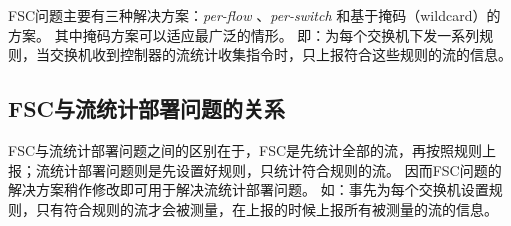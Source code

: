 FSC问题主要有三种解决方案：\emph{per-flow} \cite{van2014opennetmon}、\emph{per-switch} \cite{su2014flowcover}\cite{su2015cemon}\cite{tootoonchian2010opentm}和基于掩码（wildcard）的方案\cite{xu2017miniming}。
其中掩码方案可以适应最广泛的情形。
即：为每个交换机下发一系列规则，当交换机收到控制器的流统计收集指令时，只上报符合这些规则的流的信息。

\subsection{FSC与流统计部署问题的关系}
FSC与流统计部署问题之间的区别在于，FSC是先统计全部的流，再按照规则上报；流统计部署问题则是先设置好规则，只统计符合规则的流。
因而FSC问题的解决方案稍作修改即可用于解决流统计部署问题。
如：事先为每个交换机设置规则，只有符合规则的流才会被测量，在上报的时候上报所有被测量的流的信息。
